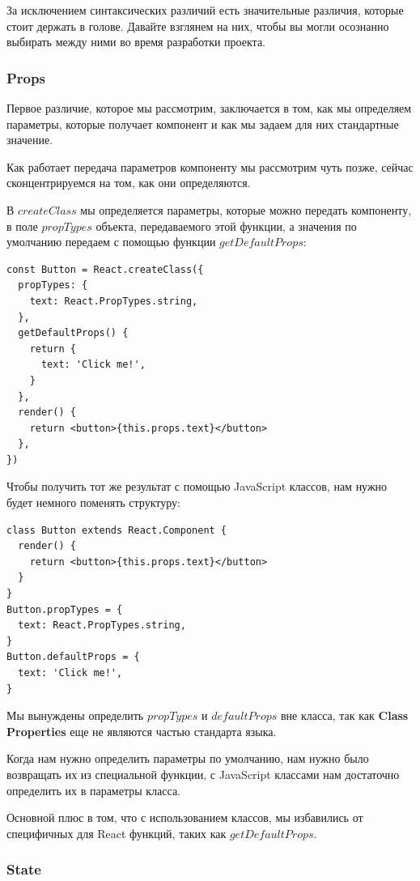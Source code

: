 За исключением синтаксических различий есть значительные различия, которые стоит держать в голове. Давайте взглянем на них, чтобы вы могли осознанно выбирать между ними во время разработки проекта.

\subsubsection{Props}

Первое различие, которое мы рассмотрим, заключается в том, как мы определяем параметры, которые получает компонент и как мы задаем для них стандартные значение.

Как работает передача параметров компоненту мы рассмотрим чуть позже, сейчас сконцентрируемся на том, как они определяются.

В $createClass$ мы определяется параметры, которые можно передать компоненту, в поле $propTypes$ объекта, передаваемого этой функции, а значения по умолчанию передаем с помощью функции $getDefaultProps$:

\begin{lstlisting}
const Button = React.createClass({
  propTypes: {
    text: React.PropTypes.string,
  },
  getDefaultProps() {
    return {
      text: 'Click me!',
    }
  },
  render() {
    return <button>{this.props.text}</button>
  }, 
})
\end{lstlisting}

Чтобы получить тот же результат с помощью JavaScript классов, нам нужно будет немного поменять структуру:

\begin{lstlisting}
class Button extends React.Component {
  render() {
    return <button>{this.props.text}</button>
  }
}
Button.propTypes = {
  text: React.PropTypes.string,
}
Button.defaultProps = {
  text: 'Click me!',
}
\end{lstlisting}

Мы вынуждены определить $propTypes$ и $defaultProps$ вне класса, так как \textbf{Class Properties} еще не являются частью стандарта языка.

Когда нам нужно определить параметры по умолчанию, нам нужно было возвращать их из специальной функции, с JavaScript классами нам достаточно определить их в параметры класса.

Основной плюс в том, что с использованием классов, мы избавились от специфичных для React функций, таких как $getDefaultProps$.

\subsubsection{State}


